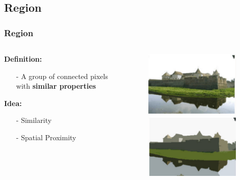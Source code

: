 \documentclass[notheorems,mathserif,table,compress]{beamer}  %
\begin{document}
\subsection{Region}
\begin{frame}
    \frametitle{Region}
     \begin{columns}
     \begin{column}[c]{0.45\textwidth}
     \textbf{\Large Definition:}
        \begin{itemize}
	  \item[-] A group of connected pixels with \textbf{similar properties} \newline
         \end{itemize}
    \textbf{\Large Idea:}
          \begin{enumerate}
          \item[-] Similarity
          \item[-] Spatial Proximity
	 \end{enumerate}
    \end{column}

    \begin{column}[c]{0.55\textwidth}
    \begin{figure}[!ht]
    \begin{minipage}[t]{0.5\linewidth}
    \centering
    \includegraphics[width=1.8in]{region_1.png}
    \end{minipage}
    \begin{minipage}[t]{0.5\linewidth}
    \centering
    \includegraphics[width=1.8in]{region_2.png}
    \end{minipage}
    \end{figure}
    \end{column}
    \end{columns}
\end{frame}
\end{document}
